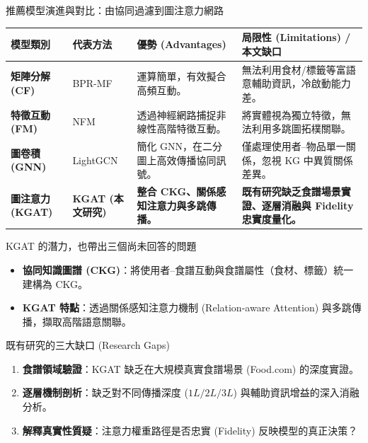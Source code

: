 \documentclass[aspectratio=169, 10pt]{beamer}
\begin{document}
\begin{frame}{推薦模型演進與對比：由協同過濾到圖注意力網路}
  \small
  \begin{table}
    \centering
    \begin{tabularx}{\textwidth}{l X X X}
      \toprule
      \textbf{模型類別} & \textbf{代表方法} & \textbf{優勢 (Advantages)} & \textbf{局限性 (Limitations) / 本文缺口} \\
      \midrule
      \textbf{矩陣分解 (CF)} & BPR-MF & 運算簡單，有效擬合高頻互動。 & 無法利用食材/標籤等富語意輔助資訊，冷啟動能力差。 \\
      \midrule
      \textbf{特徵互動 (FM)} & NFM & 透過神經網路捕捉非線性高階特徵互動。 & 將實體視為獨立特徵，無法利用多跳圖拓樸關聯。 \\
      \midrule
      \textbf{圖卷積 (GNN)} & LightGCN & 簡化 GNN，在二分圖上高效傳播協同訊號。 & 僅處理使用者--物品單一關係，忽視 KG 中異質關係差異。 \\
      \midrule
      \textbf{圖注意力 (KGAT)} & \textbf{KGAT (本文研究)} & \textbf{整合 CKG、關係感知注意力與多跳傳播。} & \textbf{既有研究缺乏食譜場景實證、逐層消融與 Fidelity 忠實度量化。} \\
      \bottomrule
    \end{tabularx}
  \end{table}
\end{frame}

\begin{frame}{KGAT 的潛力，也帶出三個尚未回答的問題}
  \begin{itemize}
    \item \textbf{協同知識圖譜 (CKG)}：將使用者--食譜互動與食譜屬性（食材、標籤）統一建構為 CKG。
    \item \textbf{KGAT 特點}：透過關係感知注意力機制 (Relation-aware Attention) 與多跳傳播，擷取高階語意關聯。
  \end{itemize}
  
  \vspace{0.3cm}
  \begin{block}{既有研究的三大缺口 (Research Gaps)}
    \begin{enumerate}
      \item \textbf{食譜領域驗證}：KGAT 缺乏在大規模真實食譜場景 (Food.com) 的深度實證。
      \item \textbf{逐層機制剖析}：缺乏對不同傳播深度 ($1L/2L/3L$) 與輔助資訊增益的深入消融分析。
      \item \textbf{解釋真實性質疑}：注意力權重路徑是否忠實 (Fidelity) 反映模型的真正決策？
    \end{enumerate}
  \end{block}
\end{frame}
\end{document}
